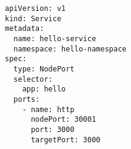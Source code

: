 \lstset{
numbers=left, 
basicstyle=\footnotesize,
frame = single, 
language=Pascal, 
framexleftmargin=16pt,
xleftmargin=2.3cm,
}
\begin{lstlisting}[linewidth=13cm, caption={The Service Manifest of the \textit{hello} Application.},label={lst:serviceManifest}]
apiVersion: v1
kind: Service
metadata:
  name: hello-service
  namespace: hello-namespace
spec:
  type: NodePort
  selector:
    app: hello
  ports:
    - name: http
      nodePort: 30001
      port: 3000
      targetPort: 3000
\end{lstlisting}